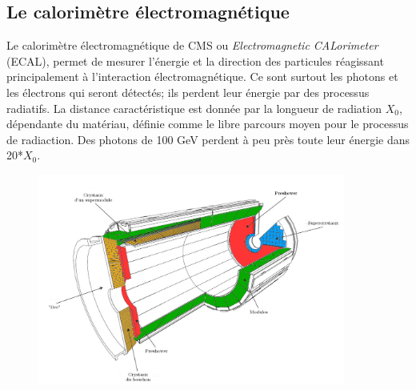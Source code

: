 \subsection{Le calorimètre électromagnétique}
Le calorimètre électromagnétique de CMS ou \textit{Electromagnetic CALorimeter} (ECAL), permet de mesurer l'énergie et la direction des particules réagissant principalement à l'interaction électromagnétique. Ce sont surtout les photons et les électrons qui seront détectés; ils perdent leur énergie par des processus radiatifs. La distance caractéristique est donnée par la longueur de radiation $X_{0}$, dépendante du matériau, définie comme le libre parcours moyen pour le processus de radiaction. Des photons de 100 GeV perdent à peu près toute leur énergie dans 20*$X_{0}$.
\begin{figure}[ht!]
	\centering
	\includegraphics[width=0.90\textwidth]{CMS/ECAL.png}
	\label{ECAL}
\end{figure}

